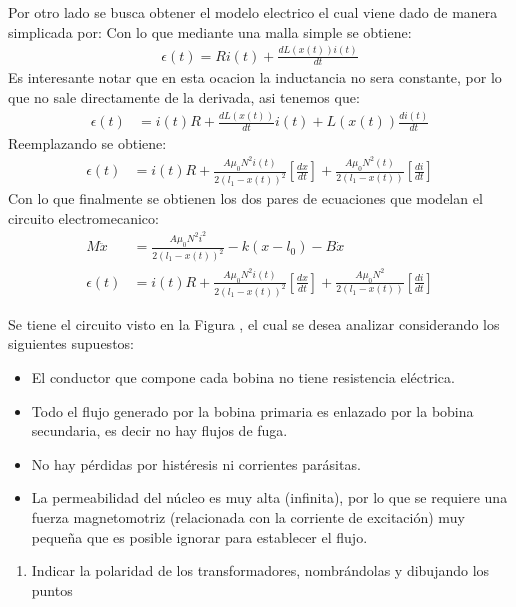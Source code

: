\documentclass[
  11pt,
  letterpaper,
   addpoints,
   answers
  ]{exam}
\begin{document}
\begin{questions}
\begin{solution}
    Por otro lado se busca obtener el modelo electrico el cual viene dado de manera simplicada por:
    Con lo que mediante una malla simple se obtiene:
    \begin{align}
        \epsilon(t) = Ri(t) + \frac{d L(x(t))i(t)}{dt}
    \end{align}
    Es interesante notar que en esta ocacion la inductancia no sera constante, por lo que no sale directamente de la derivada, asi tenemos que:
    \begin{align}
        \epsilon(t) &= i(t)R + \frac{dL(x(t))}{dt}i(t) + L(x(t))\frac{d i(t)}{dt}
    \end{align}
    Reemplazando se obtiene:
    \begin{align}
        \epsilon(t) &= i(t)R + \frac{A\mu_{0}N^{2}i(t)}{2(l_{1}-x(t))^{2}}\left[\frac{dx}{dt}\right] + \frac{A\mu_{0}N^{2}(t)}{2(l_{1}-x(t))}\left[\frac{di}{dt}\right]
    \end{align}
    Con lo que finalmente se obtienen los dos pares de ecuaciones que modelan el circuito electromecanico:
    \begin{align}
        M\ddot{x} &= \frac{A\mu_{0}N^{2}i^{2}}{2(l_{1}-x(t))^{2}} - k(x-l_{0}) - B\dot{x}\\
        \epsilon(t) &= i(t)R + \frac{A\mu_{0}N^{2}i(t)}{2(l_{1}-x(t))^{2}}\left[\frac{dx}{dt}\right] + \frac{A\mu_{0}N^{2}}{2(l_{1}-x(t))}\left[\frac{di}{dt}\right]
    \end{align}
 \end{solution}
\question Se tiene el circuito visto en la Figura , el cual se desea analizar considerando los siguientes supuestos:
\begin{itemize}
    \item El conductor que compone cada bobina no tiene resistencia eléctrica.
    \item Todo el flujo generado por la bobina primaria es enlazado por la bobina secundaria, es decir no hay flujos de fuga.
    \item No hay pérdidas por histéresis ni corrientes parásitas.
    \item La permeabilidad del núcleo es muy alta (infinita), por lo que se requiere una fuerza magnetomotriz (relacionada con la corriente de excitación) muy pequeña que es posible ignorar para establecer el flujo.
\end{itemize}
\begin{enumerate}
    \item Indicar la polaridad de los transformadores, nombrándolas y dibujando los puntos

\end{enumerate}
\end{questions}
\end{document}
